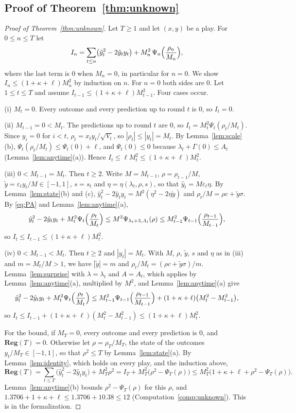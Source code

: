 \documentclass[12pt]{amsart}
\theoremstyle{definition}
\numberwithin{equation}{section}
\newcommand{\Reg}{\mathbf{Reg}}
\newcommand{\yh}{\hat y}
\begin{document}
\subsection{Proof of Theorem~\ref{thm:unknown}}
\begin{proof}[Proof of Theorem~\ref{thm:unknown}]
Let $T\ge1$ and let $(x,y)$ be a play. For $0\le n\le T$ let
\[
I_n=\sum_{t\le n}\bigl(\yh_t^2-2\yh_ty_t\bigr)+M_n^2\,\Psi_n\Bigl(\frac{\rho_n}{M_n}\Bigr),
\]
where the last term is $0$ when $M_n=0$, in particular for $n=0$. We show $I_n\le(1+\kappa+\ell)M_n^2$ by induction on $n$. For $n=0$ both sides are $0$. Let $1\le t\le T$ and assume $I_{t-1}\le(1+\kappa+\ell)M_{t-1}^2$. Four cases occur.

(i) $M_t=0$. Every outcome and every prediction up to round $t$ is $0$, so $I_t=0$.

(ii) $M_{t-1}=0<M_t$. The predictions up to round $t$ are $0$, so $I_t=M_t^2\Psi_t(\rho_t/M_t)$. Since $y_i=0$ for $i<t$, $\rho_t=x_ty_t/\sqrt{V_t}$, so $|\rho_t|\le|y_t|=M_t$. By Lemma~\ref{lem:scale}(b), $\Psi_t(\rho_t/M_t)\le\Psi_t(0)+\ell$, and $\Psi_t(0)\le0$ because $\lambda_t+\Gamma(0)\le A_t$ (Lemma~\ref{lem:anytime}(a)). Hence $I_t\le\ell M_t^2\le(1+\kappa+\ell)M_t^2$.

(iii) $0<M_{t-1}=M_t$. Then $t\ge2$. Write $M=M_{t-1}$, $\rho=\rho_{t-1}/M$, $\tilde y=\varepsilon_ty_t/M\in[-1,1]$, $s=s_t$ and $\eta=\eta(\lambda_t,\rho,s)$, so that $\yh_t=M\varepsilon_t\eta$. By Lemma~\ref{lem:state}(b) and (c), $\yh_t^2-2\yh_ty_t=M^2(\eta^2-2\eta\tilde y)$ and $\rho_t/M=\rho c+\tilde y\sigma$. By \eqref{eq:PA} and Lemma~\ref{lem:anytime}(a),
\[
\yh_t^2-2\yh_ty_t+M_t^2\Psi_t\Bigl(\frac{\rho_t}{M_t}\Bigr)\le M^2\Psi_{\lambda_t+3,A_t}(\rho)\le M_{t-1}^2\Psi_{t-1}\Bigl(\frac{\rho_{t-1}}{M_{t-1}}\Bigr),
\]
so $I_t\le I_{t-1}\le(1+\kappa+\ell)M_t^2$.

(iv) $0<M_{t-1}<M_t$. Then $t\ge2$ and $|y_t|=M_t$. With $M$, $\rho$, $\tilde y$, $s$ and $\eta$ as in (iii) and $m=M_t/M>1$, we have $|\tilde y|=m$ and $\rho_t/M_t=(\rho c+\tilde y\sigma)/m$. Lemma~\ref{lem:surprise} with $\lambda=\lambda_t$ and $A=A_t$, which applies by Lemma~\ref{lem:anytime}(a), multiplied by $M^2$, and Lemma~\ref{lem:anytime}(a) give
\[
\yh_t^2-2\yh_ty_t+M_t^2\Psi_t\Bigl(\frac{\rho_t}{M_t}\Bigr)\le M_{t-1}^2\Psi_{t-1}\Bigl(\frac{\rho_{t-1}}{M_{t-1}}\Bigr)+(1+\kappa+\ell)\bigl(M_t^2-M_{t-1}^2\bigr),
\]
so $I_t\le I_{t-1}+(1+\kappa+\ell)(M_t^2-M_{t-1}^2)\le(1+\kappa+\ell)M_t^2$.

For the bound, if $M_T=0$, every outcome and every prediction is $0$, and $\Reg(T)=0$. Otherwise let $\rho=\rho_T/M_T$, the state of the outcomes $y_t/M_T\in[-1,1]$, so that $\rho^2\le T$ by Lemma~\ref{lem:state}(a). By Lemma~\ref{lem:identity}, which holds on every play, and the induction above,
\[
\Reg(T)=\sum_{t\le T}\bigl(\yh_t^2-2\yh_ty_t\bigr)+M_T^2\rho^2=I_T+M_T^2\bigl(\rho^2-\Psi_T(\rho)\bigr)\le M_T^2\bigl(1+\kappa+\ell+\rho^2-\Psi_T(\rho)\bigr).
\]
Lemma~\ref{lem:anytime}(b) bounds $\rho^2-\Psi_T(\rho)$ for this $\rho$, and $1.3706+1+\kappa+\ell\le1.3706+10.38\le12$ (Computation~\ref{comp:unknown}). This is  in the formalization.
\end{proof}
\end{document}
